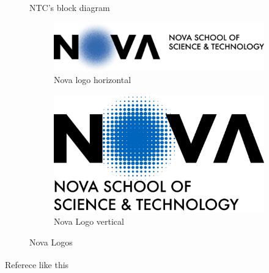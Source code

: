 \begin{figure}[H]   
\begin{centering}
    
    \caption{ NTC's block diagram }
    \label{fig:NTCBlock}

\end{centering}
\end{figure}
\begin{figure}[H]

    \centering
    \begin{subfigure}{0.4\textwidth}
        \includegraphics*[scale = 0.7]{Images/NovaFctHor.png}
        \caption{Nova logo horizontal}
        \label{fig:first}
    \end{subfigure}
    \hfill
    \begin{subfigure}{0.4\textwidth}
        \includegraphics*[scale = 0.05]{Images/NovaFctVer.png}
        \caption{Nova Logo vertical}
        \label{fig:second}
    \end{subfigure}
    
    \caption{Nova Logos}
    \label{fig:NovaLogos}
\end{figure}


Referece like this\textsuperscript{\cite{ESP32-datasheet}}
